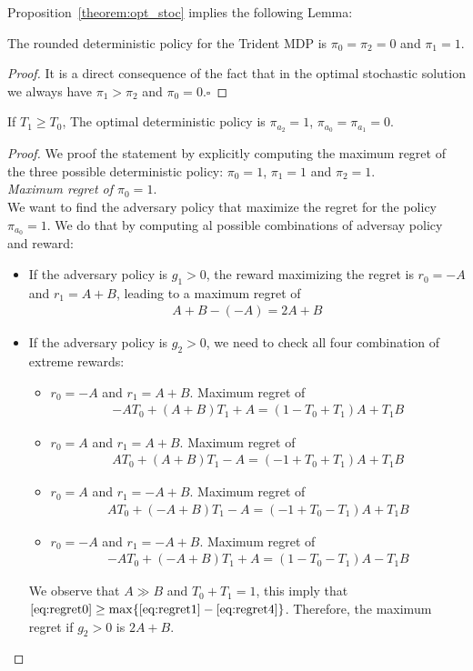 Proposition~\ref{theorem:opt_stoc} implies the following Lemma:
\begin{lemma}
The rounded deterministic policy for the Trident MDP is $\pi_0 =\pi_2 = 0$ and $\pi_1 = 1$.
\end{lemma}
\begin{proof}
It is a direct consequence of the fact that in the optimal stochastic solution we always have $\pi_1 > \pi_2$ and $\pi_0 = 0$.$\square$
\end{proof}
\begin{proposition}\label{theorem:opt_det}
If $T_1\geq T_0$, The optimal deterministic policy is $\pi_{a_2}=1$, $\pi_{a_0}=\pi_{a_1}=0$. 
\end{proposition}
\begin{proof}
We proof the statement by explicitly computing the maximum regret of the three possible deterministic policy: $\pi_0=1$, $\pi_1=1$ and $\pi_2=1$.\\
\textit{Maximum regret of $\pi_0=1$}.\\
We want to find the adversary policy that maximize the regret for the policy $\pi_{a_0}=1$. We do that by computing al possible combinations of adversay policy and reward:
\begin{itemize}
\item If the adversary policy is $g_1> 0$, the reward maximizing the regret is $r_0 = -A$ and $r_1 = A+B$, leading to a maximum regret of 
\begin{align}
A+B-(-A)=2A+B \label{eq:regret0}
\end{align}
\item If the adversary policy is $g_2>0$, we need to check all four combination of extreme rewards:
\begin{itemize}
\item $r_0 = -A$ and $r_1= A+B$. Maximum regret of
\begin{align}
-A T_0 + (A+B)T_1 + A = (1-T_0 + T_1)A + T_1 B \label{eq:regret1}
\end{align}
\item $r_0 = A$ and $r_1= A+B$. Maximum regret of
\begin{align}
A T_0 + (A+B)T_1 - A = (-1+T_0 + T_1)A + T_1 B  \label{eq:regret2}
\end{align}
\item $r_0 = A$ and $r_1= -A+B$. Maximum regret of
\begin{align} 
A T_0 + (-A+B)T_1 - A =  (-1+T_0 - T_1)A + T_1 B \label{eq:regret3}
\end{align}
\item $r_0 = -A$ and $r_1= -A+B$. Maximum regret of
\begin{align}
-A T_0 + (-A+B)T_1 + A =  (1 - T_0 - T_1)A - T_1 B \label{eq:regret4}
\end{align}
\end{itemize} 
We observe that $A\gg B$ and $T_0+T_1= 1$, this imply that  $\eqref{eq:regret0} \geq \max\{\eqref{eq:regret1}-\eqref{eq:regret4} \}$. Therefore, the maximum regret if $g_2>0$ is $2A+B$.
\end{itemize} 


\end{proof}
